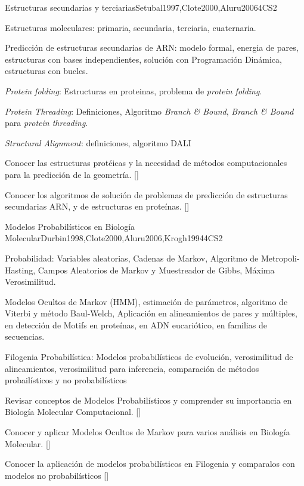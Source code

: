 \begin{syllabus}
\begin{unit}{Estructuras secundarias y terciarias}{}{Setubal1997,Clote2000,Aluru2006}{4}{CS2}
   \begin{topics}
    \item Estructuras moleculares: primaria, secundaria, terciaria, cuaternaria.
    \item Predicción de estructuras secundarias de ARN: modelo formal, energia de pares, estructuras con bases independientes, solución con Programación Dinámica, estructuras con bucles.
    \item \textit{Protein folding}: Estructuras en proteinas, problema de \textit{protein folding}.
    \item \textit{Protein Threading}: Definiciones, Algoritmo \textit{Branch \& Bound}, \textit{Branch \& Bound} para \textit{protein threading}.
    \item \textit{Structural Alignment}: definiciones, algoritmo DALI
   \end{topics}
   \begin{learningoutcomes}
     \item Conocer las estructuras protéicas y la necesidad de métodos computacionales para la predicción de la geometría. [\Familiarity]
	   \item Conocer los algoritmos de solución de problemas de predicción de estructuras secundarias ARN, y de estructuras en proteínas. [\Assessment]
   \end{learningoutcomes}
\end{unit}

\begin{unit}{Modelos Probabilísticos en Biología Molecular}{}{Durbin1998,Clote2000,Aluru2006,Krogh1994}{4}{CS2}
   \begin{topics}
    \item Probabilidad: Variables aleatorias, Cadenas de Markov, Algoritmo de Metropoli-Hasting, Campos Aleatorios de Markov y Muestreador de Gibbs, Máxima Verosimilitud.
    \item Modelos Ocultos de Markov (HMM), estimación de parámetros, algoritmo de Viterbi y método Baul-Welch, Aplicación en alineamientos de pares y múltiples, en detección de Motifs en proteínas, en ADN eucariótico, en familias de secuencias.
		\item Filogenia Probabilística: Modelos probabilísticos de evolución, verosimilitud de alineamientos, verosimilitud para inferencia, comparación de métodos probailísticos y no probabilísticos
   \end{topics}
   \begin{learningoutcomes}
      \item  Revisar conceptos de Modelos Probabilísticos y comprender su importancia en Biología Molecular Computacional. [\Assessment]
	  \item Conocer y aplicar Modelos Ocultos de Markov para varios análisis en Biología Molecular. [\Usage]
		\item Conocer la aplicación de modelos probabilísticos en Filogenia y comparalos con modelos no probabilísticos [\Assessment]
   \end{learningoutcomes}
\end{unit}


\end{syllabus}

